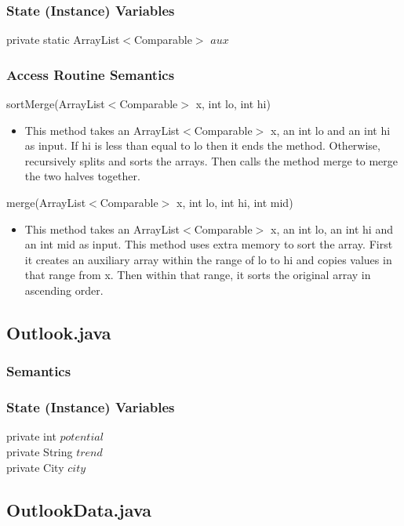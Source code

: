 \documentclass[12pt,fleqn]{article}
\begin{document}
\subsubsection*{State (Instance) Variables}
	private static ArrayList$<$Comparable$>$ $aux$
\subsubsection*{Access Routine Semantics}

\noindent sortMerge(ArrayList$<$Comparable$>$ x, int lo, int hi)
\begin{itemize}
\item This method takes an ArrayList$<$Comparable$>$ x, an int lo and an int hi as input. If hi is less than equal to lo then it ends the method. Otherwise, recursively splits and sorts the arrays. Then calls the method merge to merge the two halves together.
\end{itemize}

\noindent merge(ArrayList$<$Comparable$>$ x, int lo, int hi, int mid)
\begin{itemize}
\item This method takes an ArrayList$<$Comparable$>$ x, an int lo, an int hi and an int mid as input. This method uses extra memory to sort the array. First it creates an auxiliary array within the range of lo to hi and copies values in that range from x. Then within that range, it sorts the original array in ascending order.
\end{itemize}

\subsection*{Outlook.java}\label{poutlook}

\subsubsection*{Semantics}
\subsubsection*{State (Instance) Variables}
	private int $potential$\\
	private String $trend$\\
	private City $city$\\

\subsection*{OutlookData.java}\label{poutlookd}
\end{document}
